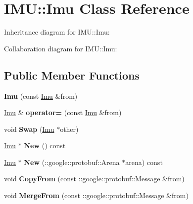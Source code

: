 \hypertarget{class_i_m_u_1_1_imu}{}\section{I\+MU\+:\+:Imu Class Reference}
\label{class_i_m_u_1_1_imu}


Inheritance diagram for I\+MU\+:\+:Imu\+:


Collaboration diagram for I\+MU\+:\+:Imu\+:
\subsection*{Public Member Functions}
\begin{DoxyCompactItemize}
\item 
\mbox{\label{class_i_m_u_1_1_imu_aeef76fb30140827ba9f547a72eed97f2}} 
{\bfseries Imu} (const \hyperlink{class_i_m_u_1_1_imu}{Imu} \&from)
\item 
\mbox{\label{class_i_m_u_1_1_imu_a51336c03d0a9b78bdc290e2757e1029e}} 
\hyperlink{class_i_m_u_1_1_imu}{Imu} \& {\bfseries operator=} (const \hyperlink{class_i_m_u_1_1_imu}{Imu} \&from)
\item 
\mbox{\label{class_i_m_u_1_1_imu_a8eaf147a1523630c736bffb4c12b32eb}} 
void {\bfseries Swap} (\hyperlink{class_i_m_u_1_1_imu}{Imu} $\ast$other)
\item 
\mbox{\label{class_i_m_u_1_1_imu_a237f1d89b036b25de0743ddaf3ef8b57}} 
\hyperlink{class_i_m_u_1_1_imu}{Imu} $\ast$ {\bfseries New} () const
\item 
\mbox{\label{class_i_m_u_1_1_imu_a5b4bfc9eb0e1455cbedfa72f59065415}} 
\hyperlink{class_i_m_u_1_1_imu}{Imu} $\ast$ {\bfseries New} (\+::google\+::protobuf\+::\+Arena $\ast$arena) const
\item 
\mbox{\label{class_i_m_u_1_1_imu_ad113d211bfa51b8263f5cfd12a177d9c}} 
void {\bfseries Copy\+From} (const \+::google\+::protobuf\+::\+Message \&from)
\item 
\mbox{\label{class_i_m_u_1_1_imu_a76cd4a4e7ab678521e1613e0552c27f0}} 
void {\bfseries Merge\+From} (const \+::google\+::protobuf\+::\+Message \&from)

\end{DoxyCompactItemize}
